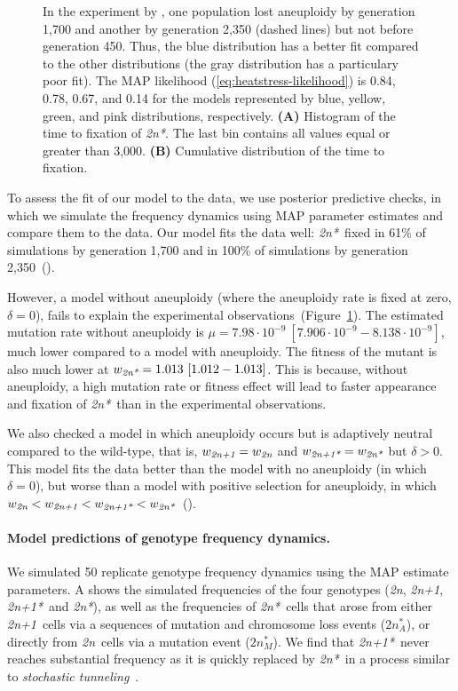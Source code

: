 \documentclass[12pt]{extarticle}
\newcommand{\euwt}{\emph{2n}}
\newcommand{\anwt}{\emph{2n+1}}
\newcommand{\eumt}{\emph{2n*}}
\newcommand{\eumtM}{\emph{$2n^*_M$}}
\newcommand{\anmt}{\emph{2n+1*}}
\begin{document}
\begin{figure}[h!]
{In the experiment by \citet{Yona2012}, one population lost aneuploidy by generation 1,700 and another by generation 2,350 (dashed lines) but not before generation 450.
Thus, the blue distribution has a better fit compared to the other distributions (the gray distribution has a particulary poor fit).
The MAP likelihood (\cref{eq:heatstress-likelihood}) is 0.84, 0.78, 0.67, and 0.14 for the models represented by blue, yellow, green, and pink distributions, respectively. 
\textbf{(A)} Histogram of the time to fixation of \eumt. The last bin contains all values equal or greater than 3,000.
\textbf{(B)} Cumulative distribution of the time to fixation. 
     }
  \label{fig:2n*-fixation}
\end{figure}

To assess the fit of our model to the data, we use posterior predictive checks, in which we simulate the frequency dynamics using MAP parameter estimates and compare them to the data.
Our model fits the data well: \eumt\ fixed in 61\% of simulations by generation 1,700 and in 100\% of simulations by generation 2,350~().
 
However, a model without aneuploidy (where the aneuploidy rate is fixed at zero, $\delta=0$), fails to explain the experimental observations~(Figure~\ref{fig:2n*-fixation}). %
The estimated mutation rate without aneuploidy is $\mu=7.98\cdot10^{-9}\ [7.906\cdot10^{-9}-8.138\cdot10^{-9}]$, much lower compared to a model with aneuploidy.
The fitness of the mutant is also much lower at $w_{\eumt}=1.013\ [1.012-1.013]$.
This is because, without aneuploidy, a high mutation rate or fitness effect will lead to faster appearance and fixation of \eumt\ than in the experimental observations. 

We also checked a model in which aneuploidy occurs but is adaptively neutral compared to the wild-type, that is, $w_{\anwt} = w_{\euwt}$ and $w_{\anmt} = w_{\eumt}$ but $\delta>0$. This model fits the data better than the model with no aneuploidy (in which $\delta=0$), but worse than a model with positive selection for aneuploidy, in which $w_{\euwt}<w_{\anwt}<w_{\anmt}<w_{\eumt}$~(). 


\paragraph{Model predictions of genotype frequency dynamics.}

We simulated 50 replicate genotype frequency dynamics using the MAP estimate parameters. 
A shows the simulated frequencies of the four genotypes (\euwt, \anwt, \anmt\ and \eumt), as well as the frequencies of \eumt\ cells that arose from either \anwt\ cells via a sequences of mutation and chromosome loss events ($2n^*_A$), or directly from \euwt\ cells via a mutation event (\eumtM).
We find that \anmt\ never reaches substantial frequency as it is quickly replaced by \eumt\ in a process similar to \emph{stochastic tunneling}~\citep{Iwasa2004,Komarova2003}.
\end{document}

